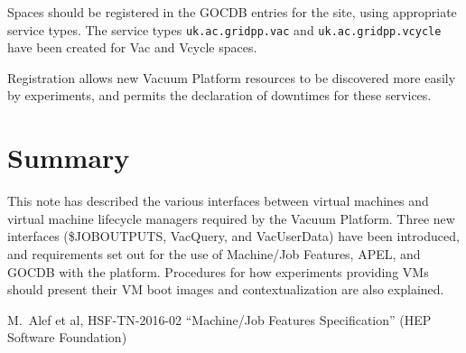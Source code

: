 \documentclass[12pt,a4paper]{article}
\begin{document}
Spaces should be registered in the GOCDB entries for the site, using 
appropriate service types. The service types \texttt{uk.ac.gridpp.vac} and 
\texttt{uk.ac.gridpp.vcycle} have been created for Vac and Vcycle
spaces.

Registration allows new Vacuum Platform resources to be discovered more easily
by experiments, and permits the declaration of downtimes for these services.

%


\section{Summary}
\label{sec:Summary}

This note has described the various interfaces between virtual machines and
virtual machine lifecycle managers required by the Vacuum Platform. Three new
interfaces (\$JOBOUTPUTS, VacQuery, and VacUserData) have been introduced,
and requirements set out for the use of Machine/Job Features, APEL, and
GOCDB with the platform. Procedures for how experiments providing VMs should
present their VM boot images and contextualization are also explained.



\begin{thebibliography}{9}


 M.~Alef et al, HSF-TN-2016-02 ``Machine/Job Features Specification'' (HEP Software Foundation)

\end{thebibliography}


\end{document}
